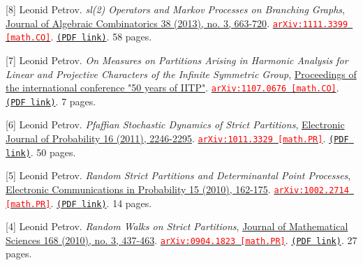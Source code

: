 \begin{etaremune}
\item[{[8]}] 
Leonid Petrov.
\emph{sl(2) Operators and Markov Processes on Branching Graphs}, \href{}{Journal of Algebraic Combinatorics 38 (2013), no. 3, 663-720}. 
\href{https://arxiv.org/abs/1111.3399}{\texttt{{\textcolor{red}{arXiv:1111.3399 [math.CO]}}}}. \href{https://storage.lpetrov.cc/papers/08-sl2_operators_and.pdf}{\texttt{(PDF link)}}. 58 pages.







\item[{[7]}] 
Leonid Petrov.
\emph{On Measures on Partitions Arising in Harmonic Analysis for Linear and Projective Characters of the Infinite Symmetric Group}, \href{}{Proceedings of the international conference "50 years of IITP"}. 
\href{https://arxiv.org/abs/1107.0676}{\texttt{{\textcolor{red}{arXiv:1107.0676 [math.CO]}}}}. \href{https://storage.lpetrov.cc/papers/07-on_measures_on.pdf}{\texttt{(PDF link)}}. 7 pages.





\item[{[6]}] 
Leonid Petrov.
\emph{Pfaffian Stochastic Dynamics of Strict Partitions}, \href{http://projecteuclid.org/euclid.ejp/1464820251}{Electronic Journal of Probability 16 (2011), 2246-2295}. 
\href{https://arxiv.org/abs/1011.3329}{\texttt{{\textcolor{red}{arXiv:1011.3329 [math.PR]}}}}. \href{https://storage.lpetrov.cc/papers/06-pfaffian_stochastic_dynamics.pdf}{\texttt{(PDF link)}}. 50 pages.



\item[{[5]}] 
Leonid Petrov.
\emph{Random Strict Partitions and Determinantal Point Processes}, \href{http://projecteuclid.org/euclid.ecp/1465243959}{Electronic Communications in Probability 15 (2010), 162-175}. 
\href{https://arxiv.org/abs/1002.2714}{\texttt{{\textcolor{red}{arXiv:1002.2714 [math.PR]}}}}. \href{https://storage.lpetrov.cc/papers/05-random_strict_partitions.pdf}{\texttt{(PDF link)}}. 14 pages.







\item[{[4]}] 
Leonid Petrov.
\emph{Random Walks on Strict Partitions}, \href{}{Journal of Mathematical Sciences 168 (2010), no. 3, 437-463}. 
\href{https://arxiv.org/abs/0904.1823}{\texttt{{\textcolor{red}{arXiv:0904.1823 [math.PR]}}}}. \href{https://storage.lpetrov.cc/papers/04-random_walks_on.pdf}{\texttt{(PDF link)}}. 27 pages.




\end{etaremune}
